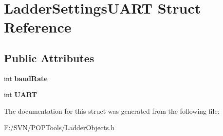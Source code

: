 \hypertarget{struct_ladder_settings_u_a_r_t}{\section{Ladder\-Settings\-U\-A\-R\-T Struct Reference}
\label{struct_ladder_settings_u_a_r_t}
}
\subsection*{Public Attributes}
\begin{DoxyCompactItemize}
\item 
\hypertarget{struct_ladder_settings_u_a_r_t_ab16b1099f740d957f4c848d271952bba}{int {\bfseries baud\-Rate}}\label{struct_ladder_settings_u_a_r_t_ab16b1099f740d957f4c848d271952bba}

\item 
\hypertarget{struct_ladder_settings_u_a_r_t_ab3de835df4c4c91dfab42773bfb69663}{int {\bfseries U\-A\-R\-T}}\label{struct_ladder_settings_u_a_r_t_ab3de835df4c4c91dfab42773bfb69663}

\end{DoxyCompactItemize}


The documentation for this struct was generated from the following file\-:\begin{DoxyCompactItemize}
\item 
F\-:/\-S\-V\-N/\-P\-O\-P\-Tools/Ladder\-Objects.\-h\end{DoxyCompactItemize}
